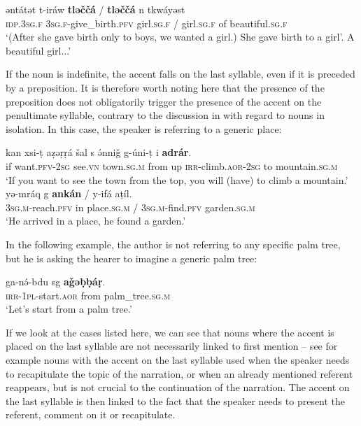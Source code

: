 \documentclass[output=paper]{langsci/langscibook}
\begin{document}
\begin{exe}
\ex\label{5ex:12}
\gll	əntátət	t-iráw	{\textbf{tləččá}}	/  {\textbf{tləččá}}	n	tkwáyəst \\
	{\textsc{idp.3sg.f}}	{\textsc{3sg.f}}-give\_birth.{\textsc{pfv}}	girl.{\textsc{sg.f}}	/  girl.{\textsc{sg.f}}	of	beautiful.{\textsc{sg.f}} \\
\glt	`(After she gave birth only to boys, we wanted a girl.) She gave birth to a girl'. A beautiful girl...'
\end{exe}

If the noun is indefinite, the accent falls on the last syllable, even if it is preceded by a preposition. It is therefore worth noting here that the presence of the preposition does not obligatorily trigger the presence of the accent on the penultimate syllable, contrary to the discussion in  with regard to nouns in isolation. In this case, the speaker is referring to a generic place:

\begin{exe}
\ex\label{5ex:13}
\gll	kan xsi-ṭ aẓəṛṛá šal s ə́nniǧ g-úni-ṭ i {\textbf{adrár}}. \\
	if want.{\textsc{pfv-2sg}} see.{\textsc{vn}} town.{\textsc{sg.m}} from up {\textsc{irr}}-climb.{\textsc{aor-2sg}} to mountain.{\textsc{sg.m}} \\
\glt	`If you want to see the town from the top, you will (have) to climb a mountain.'
\ex\label{5ex:14}
\gll	yə-mráq g {\textbf{ankán}} / y-ifá	aṭíl. \\
	{\textsc{3sg.m}}-reach.{\textsc{pfv}} in place.{\textsc{sg.m}} / {\textsc{3sg.m}}-find.{\textsc{pfv}} garden.{\textsc{sg.m}} \\
\glt	`He arrived in a place, he found a garden.'
\end{exe}

In the following example, the author is not referring to any specific palm tree, but he is asking the hearer to imagine a generic palm tree:

\begin{exe}
\ex\label{5ex:15}
\gll	ga-nə́-bdu		sg	{\textbf{aǧəḅḅáṛ}}. \\
	{\textsc{irr-1pl}}-start.{\textsc{aor}} from palm\_tree.{\textsc{sg.m}} \\
\glt	`Let's start from a palm tree.'
\end{exe}

If we look at the cases listed here, we can see that nouns where the accent is placed on the last syllable are not necessarily linked to first mention -- see for example nouns with the accent on the last syllable used when the speaker needs to recapitulate the topic of the narration, or when an already mentioned referent reappears, but is not crucial to the continuation of the narration. The accent on the last syllable is then linked to the fact that the speaker needs to present the referent, comment on it or recapitulate.
\end{document}

